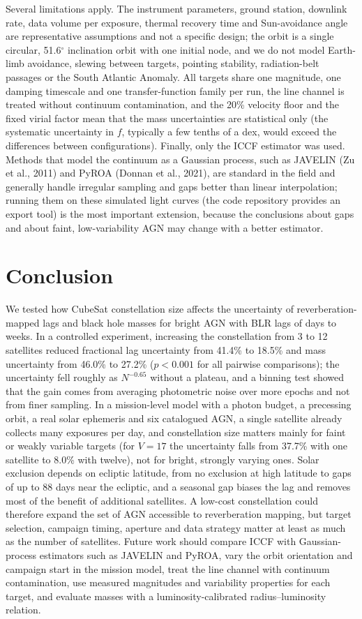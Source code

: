 \documentclass[11pt]{article}
\begin{document}
Several limitations apply. The instrument parameters, ground station, downlink rate, data volume per exposure, thermal recovery time and Sun-avoidance angle are representative assumptions and not a specific design; the orbit is a single circular, 51.6$^{\circ}$ inclination orbit with one initial node, and we do not model Earth-limb avoidance, slewing between targets, pointing stability, radiation-belt passages or the South Atlantic Anomaly. All targets share one magnitude, one damping timescale and one transfer-function family per run, the line channel is treated without continuum contamination, and the 20\% velocity floor and the fixed virial factor mean that the mass uncertainties are statistical only (the systematic uncertainty in $f$, typically a few tenths of a dex, would exceed the differences between configurations). Finally, only the ICCF estimator was used. Methods that model the continuum as a Gaussian process, such as JAVELIN (Zu et al., 2011) and PyROA (Donnan et al., 2021), are standard in the field and generally handle irregular sampling and gaps better than linear interpolation; running them on these simulated light curves (the code repository provides an export tool) is the most important extension, because the conclusions about gaps and about faint, low-variability AGN may change with a better estimator.

\section{Conclusion}

We tested how CubeSat constellation size affects the uncertainty of reverberation-mapped lags and black hole masses for bright AGN with BLR lags of days to weeks. In a controlled experiment, increasing the constellation from 3 to 12 satellites reduced fractional lag uncertainty from 41.4\% to 18.5\% and mass uncertainty from 46.0\% to 27.2\% ($p<0.001$ for all pairwise comparisons); the uncertainty fell roughly as $N^{-0.65}$ without a plateau, and a binning test showed that the gain comes from averaging photometric noise over more epochs and not from finer sampling. In a mission-level model with a photon budget, a precessing orbit, a real solar ephemeris and six catalogued AGN, a single satellite already collects many exposures per day, and constellation size matters mainly for faint or weakly variable targets (for $V = 17$ the uncertainty falls from 37.7\% with one satellite to 8.0\% with twelve), not for bright, strongly varying ones. Solar exclusion depends on ecliptic latitude, from no exclusion at high latitude to gaps of up to 88 days near the ecliptic, and a seasonal gap biases the lag and removes most of the benefit of additional satellites. A low-cost constellation could therefore expand the set of AGN accessible to reverberation mapping, but target selection, campaign timing, aperture and data strategy matter at least as much as the number of satellites. Future work should compare ICCF with Gaussian-process estimators such as JAVELIN and PyROA, vary the orbit orientation and campaign start in the mission model, treat the line channel with continuum contamination, use measured magnitudes and variability properties for each target, and evaluate masses with a luminosity-calibrated radius--luminosity relation.
\end{document}
